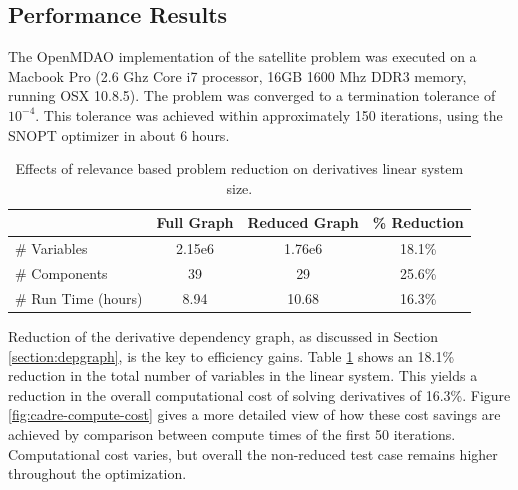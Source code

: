 \documentclass[]{aiaa-tc} %
\begin{document}
        \subsection{Performance Results}

            The OpenMDAO implementation of the satellite problem was executed on a
            Macbook Pro (2.6 Ghz Core i7 processor, 16GB 1600 Mhz DDR3 memory, running OSX 10.8.5). 
            The problem was converged to a termination tolerance of $10^{-4}$. This tolerance
            was achieved within approximately 150 iterations, using the SNOPT\cite{gill2005snopt}
            optimizer in about 6 hours. 


            \begin{table}
                \centering
                \caption{Effects of relevance based problem reduction on derivatives linear system size.}
                \begin{tabular}{l c c c}
                    \hline

                                 & Full Graph & Reduced Graph & \% Reduction\\
                    \hline

                    \# Variables  & 2.15e6 & 1.76e6 & 18.1\%\\ \hline
                    \# Components & 39 & 29 & 25.6\%\\ \hline
                    \# Run Time (hours) & 8.94 & 10.68 & 16.3\%\\ 
                    \hline
                \end{tabular}   
                \label{tab:cadre-relevance-reduction}
            \end{table}

            Reduction of the derivative dependency graph, as discussed in
            Section \ref{section:depgraph}, is the key to efficiency gains. Table \ref{tab:cadre-relevance-reduction}
            shows an 18.1\% reduction in the total number of variables in the linear system. This yields a 
            reduction in the overall computational cost of solving derivatives of 16.3\%. Figure \ref{fig:cadre-compute-cost}
            gives a more detailed view of how these cost savings are achieved by comparison between compute times
            of the first 50 iterations. Computational cost varies, but overall the non-reduced test case remains higher
            throughout the optimization. 
\end{document}
